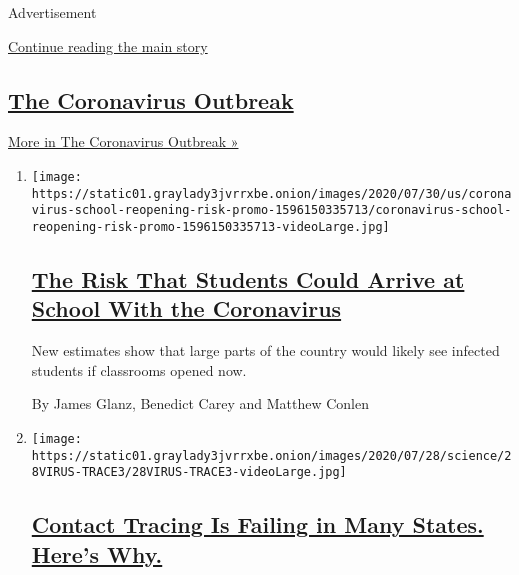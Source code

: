 Advertisement

\protect\hyperlink{after-mid1}{Continue reading the main story}

\hypertarget{the-coronavirus-outbreak}{%
\subsection{\texorpdfstring{\href{/news-event/coronavirus}{The
Coronavirus
Outbreak}}{The Coronavirus Outbreak}}\label{the-coronavirus-outbreak}}

\href{/news-event/coronavirus}{More in The Coronavirus Outbreak »}

\begin{enumerate}
\def\labelenumi{\arabic{enumi}.}
\item
  \texttt{[image: https://static01.graylady3jvrrxbe.onion/images/2020/07/30/us/coronavirus-school-reopening-risk-promo-1596150335713/coronavirus-school-reopening-risk-promo-1596150335713-videoLarge.jpg]}

  \hypertarget{the-risk-that-students-could-arrive-at-school-with-the-coronavirus}{%
  \subsection{\texorpdfstring{\href{/interactive/2020/07/31/us/coronavirus-school-reopening-risk.html}{The
  Risk That Students Could Arrive at School With the
  Coronavirus}}{The Risk That Students Could Arrive at School With the Coronavirus}}\label{the-risk-that-students-could-arrive-at-school-with-the-coronavirus}}

  New estimates show that large parts of the country would likely see
  infected students if classrooms opened now.

  By James Glanz, Benedict Carey and Matthew Conlen
\item
  \texttt{[image: https://static01.graylady3jvrrxbe.onion/images/2020/07/28/science/28VIRUS-TRACE3/28VIRUS-TRACE3-videoLarge.jpg]}

  \hypertarget{contact-tracing-is-failing-in-many-states-heres-why}{%
  \subsection{\texorpdfstring{\href{/2020/07/31/health/covid-contact-tracing-tests.html}{Contact
  Tracing Is Failing in Many States. Here's
  Why.}}{Contact Tracing Is Failing in Many States. Here's Why.}}\label{contact-tracing-is-failing-in-many-states-heres-why}}


\end{enumerate}
